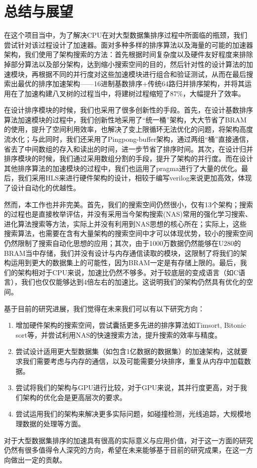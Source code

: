 
\chapter{总结与展望}


在这个项目当中，为了解决CPU在对大型数据集排序过程中所面临的瓶颈，我们尝试针对该过程设计了加速器。面对多种多样的排序算法以及海量的可能的加速器架构，我们使用了架构搜索的方法：首先根据时间复杂度以及硬件友好程度来排除掉部分算法以及部分架构，达到缩小搜索空间的目的，然后针对性的设计算法的加速模块，再根据不同的并行度对这些加速模块进行组合和验证测试，从而在最后搜索出最优的排序加速架构——16进制基数排序+传统64路归并排序架构，并将其运用在了加速构建八叉树的过程当中，将建树过程缩短了87\%，大幅提升了效率。

在设计排序模块的时候，我们也采用了很多创新性的手段。首先，在设计基数排序算法加速模块的过程中，我们创新性地采用了“统一桶”架构，大大节省了BRAM的使用，提升了空间利用效率，也解决了变上限循环无法优化的问题，将架构高度流水化；与此同时，我们还采用了Pingpong-buffer架构，通过两组“桶”直接通信，省去了中间数组的存入和读出的时间，进一步节省了排序时间。其次，在设计归并排序模块的时候，我们通过采用数组分割的手段，提升了架构的并行度。而在设计其他排序算法的加速模块的过程中，我们也运用了pragma进行了大量的优化。最后，我们采用HLS来进行硬件架构的设计，相较于编写verilog来说更加高效，体现了设计自动化的优越性。

然而，本工作也并非完美。首先，我们的搜索空间仍然很小，仅有13个架构；搜索的过程也是直接枚举评估，并没有采用当今架构搜索(NAS)常用的强化学习搜索、进化算法搜索等方法，实际上并没有利用到NAS思想的核心所在；实际上，这些搜索算法，也需要在含有大量架构的搜索空间中才可以体现优势，较小的搜索空间仍然限制了搜索自动化思想的应用；其次，由于1000万数据仍然能够在U280的BRAM当中存储，我们并没有设计与内存通信读取的模块，这限制了将我们的架构运用到更大的数据集上的可能性，因为BRAM一定是有存储上限的。最后，我们的架构相对于CPU来说，加速比仍然不够多。对于较底层的变成语言（如C语言），我们也仅仅能够达到4倍左右的加速比。这说明我们的架构仍然具有优化的空间。

基于目前的研究进展，我们觉得在未来我们可以有以下研究方向：
\begin{enumerate}
    \item 增加硬件架构的搜索空间，尝试囊括更多先进的排序算法如Timsort, Bitonic sort等，并尝试利用NAS的快速搜索方法，提升搜索的效率与精度。
    \item 尝试设计适用更大型数据集（如包含1亿数据的数据集）的加速架构，这就要求我们需要考虑与内存的通信，以及可能需要分块排序，重复从内存中加载数据。
    \item 尝试将我们的架构与GPU进行比较，对于GPU来说，其并行度更高，对于我们架构的优化会是更高层次的要求。
    \item 尝试运用我们的架构来解决更多实际问题，如碰撞检测，光线追踪，大规模地理数据的处理等方面。
\end{enumerate}

对于大型数据集排序的加速具有很高的实际意义与应用价值，对于这一方面的研究仍然有很多值得令人深究的方向，希望在未来能够基于目前的研究成果，在这一方向做出一定的贡献。